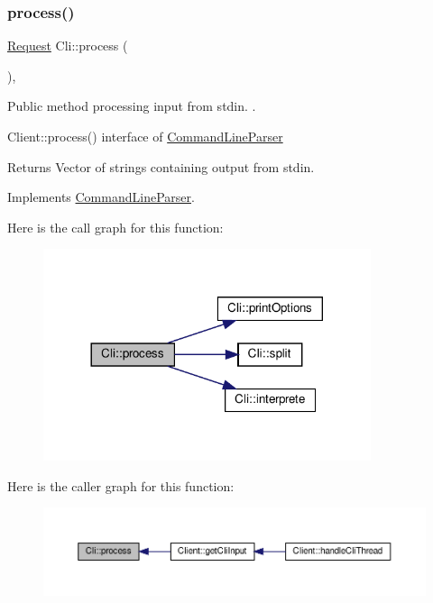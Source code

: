 \subsubsection{\texorpdfstring{process()}{process()}\hspace{0.1cm}{\footnotesize\ttfamily [1/2]}}
{\footnotesize\ttfamily \hyperlink{classRequest}{Request} Cli\+::process (\begin{DoxyParamCaption}{ }\end{DoxyParamCaption})\hspace{0.3cm}{\ttfamily [override]}, {\ttfamily [virtual]}}



Public method processing input from stdin. . 

Client\+::process() interface of \hyperlink{classCommandLineParser}{Command\+Line\+Parser} \begin{DoxyReturn}{Returns}
Vector of strings containing output from stdin. 
\end{DoxyReturn}


Implements \hyperlink{classCommandLineParser}{Command\+Line\+Parser}.

Here is the call graph for this function\+:\nopagebreak
\begin{figure}[H]
\begin{center}
\leavevmode
\includegraphics[width=272pt]{classCli_aa2b3675ef3e3bb01ed0d1997460a0e28_cgraph}
\end{center}
\end{figure}
Here is the caller graph for this function\+:\nopagebreak
\begin{figure}[H]
\begin{center}
\leavevmode
\includegraphics[width=350pt]{classCli_aa2b3675ef3e3bb01ed0d1997460a0e28_icgraph}
\end{center}
\end{figure}
\mbox{\label{classCli_a4ee41556f8c3a736d813f0d937413da0}} 
